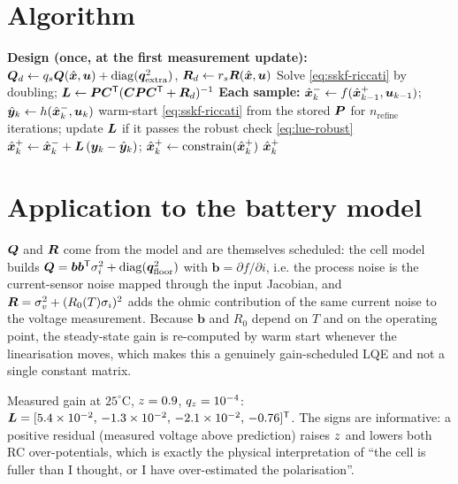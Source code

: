 \section{Algorithm}
\begin{algorithm}[H]
\caption{SSKF --- design (at reset) and one sampling period}
\begin{algorithmic}[1]
\Statex \textbf{Design (once, at the first measurement update):}
\State $\bm{Q}_d \gets q_s\bm{Q}(\hat{\bm{x}},\bm{u}) + \operatorname{diag}(\bm{q}_{\mathrm{extra}}^2)$, \quad $\bm{R}_d \gets r_s\bm{R}(\hat{\bm{x}},\bm{u})$
\State Solve \eqref{eq:sskf-riccati} by doubling; \quad $\bm{L} \gets \bm{P}\bm{C}^{\mathsf{T}}(\bm{C}\bm{P}\bm{C}^{\mathsf{T}}+\bm{R}_d)^{-1}$
\Statex \textbf{Each sample:}
\State $\hat{\bm{x}}^{-}_k \gets f(\hat{\bm{x}}^{+}_{k-1},\bm{u}_{k-1})$; \quad $\hat{\bm{y}}_k \gets h(\hat{\bm{x}}^{-}_k,\bm{u}_k)$
  \State warm-start \eqref{eq:sskf-riccati} from the stored $\bm{P}$ for $n_{\mathrm{refine}}$ iterations; update $\bm{L}$ if it passes the robust check \eqref{eq:lue-robust}
\EndIf
\State $\hat{\bm{x}}^{+}_k \gets \hat{\bm{x}}^{-}_k + \bm{L}\,(\bm{y}_k - \hat{\bm{y}}_k)$; \quad $\hat{\bm{x}}^{+}_k \gets \operatorname{constrain}(\hat{\bm{x}}^{+}_k)$
\Ensure $\hat{\bm{x}}^{+}_k$
\end{algorithmic}
\end{algorithm}

\section{Application to the battery model}
$\bm{Q}$ and $\bm{R}$ come from the model and are themselves scheduled: the cell model builds
$\bm{Q} = \bm{b}\bm{b}^{\mathsf{T}}\sigma_i^2 + \operatorname{diag}(\bm{q}_{\mathrm{floor}}^2)$ with
$\bm{b} = \partial f/\partial i$, i.e. the process noise is the current-sensor noise mapped
through the input Jacobian, and $\bm{R} = \sigma_v^2 + (R_0(T)\sigma_i)^2$ adds the ohmic
contribution of the same current noise to the voltage measurement.  Because $\bm{b}$ and $R_0$
depend on $T$ and on the operating point, the steady-state gain is re-computed by warm start
whenever the linearisation moves, which makes this a genuinely gain-scheduled LQE and not a
single constant matrix.

Measured gain at $25^\circ$C, $z = 0.9$, $q_{z}=10^{-4}$:
$\bm{L} = [5.4\times10^{-2},\,-1.3\times10^{-2},\,-2.1\times10^{-2},\,-0.76]^{\mathsf{T}}$.  The signs are
informative: a positive residual (measured voltage above prediction) raises $z$ and lowers
both RC over-potentials, which is exactly the physical interpretation of ``the cell is fuller
than I thought, or I have over-estimated the polarisation''.

